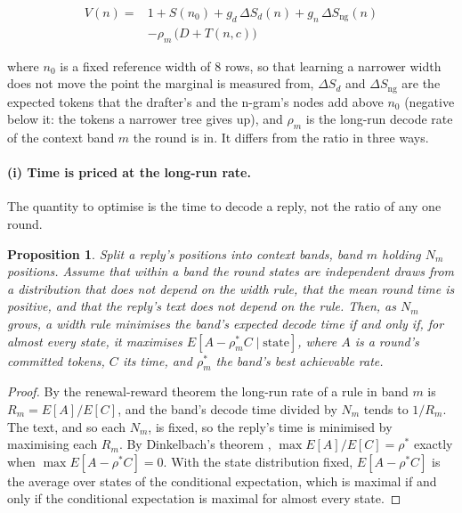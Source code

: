 \documentclass[10pt,twocolumn,letterpaper]{article}
\newtheorem{proposition}{Proposition}
\begin{document}
\begin{equation}\label{eq:7}
\begin{split}
V(n) = {}& 1 + S(n_0) + g_d\,\Delta S_d(n) + g_n\,\Delta S_{\mathrm{ng}}(n)\\
         & - \rho_m\,\bigl(D + T(n, c)\bigr)
\end{split}
\end{equation}

where $n_{0}$ is a fixed reference width of 8 rows, so that learning a narrower width does not move the point the marginal is measured from, $\Delta S_{d}$ and $\Delta S_{\mathrm{ng}}$ are the expected tokens that the drafter's and the n-gram's nodes add above $n_{0}$ (negative below it: the tokens a narrower tree gives up), and $\rho_{m}$ is the long-run decode rate of the context band $m$ the round is in. It differs from the ratio in three ways.

\paragraph{(i) Time is priced at the long-run rate.} The quantity to optimise is the time to decode a reply, not the ratio of any one round.

\begin{proposition}\label{prop:5}
Split a reply's positions into context bands, band $m$ holding $N_m$ positions. Assume that within a band the round states are independent draws from a distribution that does not depend on the width rule, that the mean round time is positive, and that the reply's text does not depend on the rule. Then, as $N_m$ grows, a width rule minimises the band's expected decode time if and only if, for almost every state, it maximises $E[A - \rho_m^{*} C \mid \text{state}]$, where $A$ is a round's committed tokens, $C$ its time, and $\rho_m^{*}$ the band's best achievable rate.
\end{proposition}

\begin{proof}
By the renewal-reward theorem the long-run rate of a rule in band $m$ is $R_m = E[A]/E[C]$, and the band's decode time divided by $N_m$ tends to $1/R_m$. The text, and so each $N_m$, is fixed, so the reply's time is minimised by maximising each $R_m$. By Dinkelbach's theorem \cite{dinkelbach1967nonlinear}, $\max E[A]/E[C] = \rho^{*}$ exactly when $\max E[A - \rho^{*} C] = 0$. With the state distribution fixed, $E[A - \rho^{*} C]$ is the average over states of the conditional expectation, which is maximal if and only if the conditional expectation is maximal for almost every state.
\end{proof}
\end{document}
